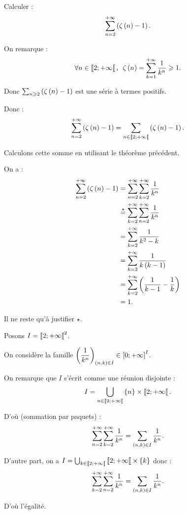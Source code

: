 \begin{dem}
\end{dem}

\begin{exoex}
Calculer : \[\sum_{n=2}^{+\infty}\left(\zeta\left(n\right)-1\right).\]
\end{exoex}

\begin{corr}
On remarque : \[\quantifs{\forall n\in\interventierie{2}{\pinf}}\zeta\paren{n}=\sum_{k=1}^{\pinf}\dfrac{1}{k^n}\geq1.\]

Donc \(\sum_{n\geqslant2}\left(\zeta\left(n\right)-1\right)\) est une série à termes positifs.

Donc : \[\sum_{n=2}^{+\infty}\left(\zeta\left(n\right)-1\right)=\sum_{n\in\left\llbracket2;+\infty\right\llbracket}\left(\zeta\left(n\right)-1\right).\]

Calculons cette somme en utilisant le théorème précédent.

\begin{brouill}
On a : \[\begin{aligned}
\sum_{n=2}^{+\infty}\left(\zeta\left(n\right)-1\right)&=\sum_{n=2}^{+\infty}\sum_{k=2}^{+\infty}\dfrac{1}{k^n} \\
&\overset{\star}{=}\sum_{k=2}^{+\infty}\sum_{n=2}^{+\infty}\dfrac{1}{k^n} \\
&=\sum_{k=2}^{+\infty}\dfrac{1}{k^2-k} \\
&=\sum_{k=2}^{+\infty}\dfrac{1}{k\left(k-1\right)} \\
&=\sum_{k=2}^{+\infty}\left(\dfrac{1}{k-1}-\dfrac{1}{k}\right) \\
&=1.
\end{aligned}\]
\end{brouill}

Il ne reste qu'à justifier \(\star\).

Posons \(I=\left\llbracket2;+\infty\right\llbracket^2\).

On considère la famille \(\left(\dfrac{1}{k^n}\right)_{\left(n,k\right)\in I}\in\left[0;+\infty\right]^I\).

On remarque que \(I\) s'écrit comme une réunion disjointe : \[I=\bigcup_{n\in\left\llbracket2;+\infty\right\llbracket}\left\lbrace n\right\rbrace\times\left\llbracket2;+\infty\right\llbracket.\]

D'où (sommation par paquets) : \[\sum_{n=2}^{+\infty}\sum_{k=2}^{+\infty}\dfrac{1}{k^n}=\sum_{\left(n,k\right)\in I}\dfrac{1}{k^n}.\]

D'autre part, on a \(I=\bigcup_{k\in\left\llbracket2;+\infty\right\llbracket}\left\llbracket2;+\infty\right\llbracket\times\left\lbrace k\right\rbrace\) donc : \[\sum_{k=2}^{+\infty}\sum_{n=2}^{+\infty}\dfrac{1}{k^n}=\sum_{\left(n,k\right)\in I}\dfrac{1}{k^n}.\]

D'où l'égalité.
\end{corr}

